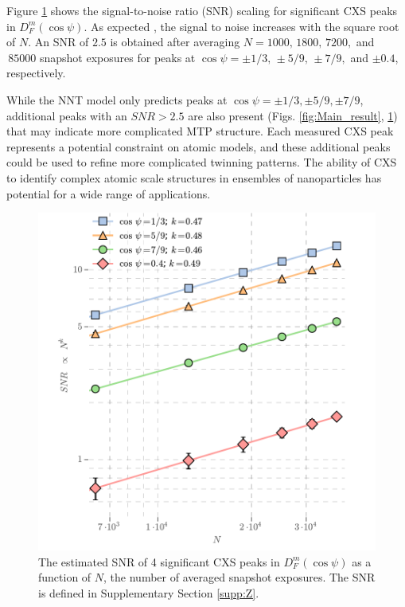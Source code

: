 \documentclass [12pt,fleqn]{article}
\begin{document}
Figure \ref{fig:pk} shows the signal-to-noise ratio (SNR) scaling for significant CXS peaks in $D^m_F(\cos \psi)$. As expected \cite{kirian2011signal}, the signal to noise increases with the square root of $N$. An SNR of $2.5$ is obtained after averaging $N=1000,\,1800,\,7200,$ and $\,85000$ snapshot exposures for peaks at $\cos \psi = \pm 1/3,\, \pm 5/9,\, \pm 7/9,$ and $\pm 0.4$, respectively.

While the NNT model only predicts peaks at $\cos \psi = \pm1/3, \pm 5/9, \pm 7/9$, additional peaks with an $SNR > 2.5$ are also present (Figs. \ref{fig:Main_result}, \ref{fig:pk}) that may indicate more complicated MTP structure. Each measured CXS peak represents a potential constraint on atomic models, and these additional peaks could be used to refine more complicated twinning patterns. The ability of CXS to identify complex atomic scale structures in ensembles of nanoparticles has potential for a wide range of applications. 
 
\begin{figure}[H]
\includegraphics[scale=0.6]{./Fig5Apr8.pdf}
\caption{The estimated SNR of 4 significant CXS peaks in $D^m_F(\cos \psi)$ as a function of $N$, the number of averaged snapshot exposures. The SNR is defined in Supplementary Section \ref{supp:Z}.}
\label{fig:pk}
\end{figure}
\end{document}
